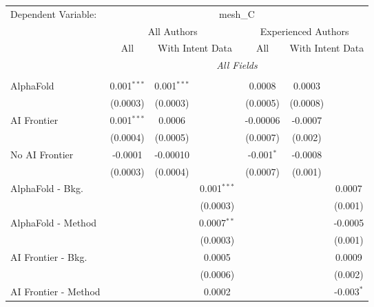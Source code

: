 \begingroup
\centering
\begin{tabular}{lcccccc}
   \tabularnewline \midrule \midrule
   Dependent Variable: & \multicolumn{6}{c}{mesh\_C}\\
 & \multicolumn{3}{c}{All Authors} & \multicolumn{3}{c}{Experienced Authors} \\
\cmidrule(lr){2-4} \cmidrule(lr){5-7}
 & \multicolumn{1}{c}{All} & \multicolumn{2}{c}{With Intent Data} & \multicolumn{1}{c}{All} & \multicolumn{2}{c}{With Intent Data} \\
\cmidrule(lr){2-2} \cmidrule(lr){3-4} \cmidrule(lr){5-5} \cmidrule(lr){6-7}
 & \multicolumn{6}{c}{\textit{All Fields}} \\ \\
   AlphaFold               & 0.001$^{***}$ & 0.001$^{***}$ &               & 0.0008       & 0.0003   &   \\   
                           & (0.0003)      & (0.0003)      &               & (0.0005)     & (0.0008) &   \\   
   AI Frontier             & 0.001$^{***}$ & 0.0006        &               & -0.00006     & -0.0007  &   \\   
                           & (0.0004)      & (0.0005)      &               & (0.0007)     & (0.002)  &   \\   
   No AI Frontier          & -0.0001       & -0.00010      &               & -0.001$^{*}$ & -0.0008  &   \\   
                           & (0.0003)      & (0.0004)      &               & (0.0007)     & (0.001)  &   \\   
   AlphaFold - Bkg.        &               &               & 0.001$^{***}$ &              &          & 0.0007\\   
                           &               &               & (0.0003)      &              &          & (0.001)\\   
   AlphaFold - Method      &               &               & 0.0007$^{**}$ &              &          & -0.0005\\   
                           &               &               & (0.0003)      &              &          & (0.001)\\   
   AI Frontier - Bkg.      &               &               & 0.0005        &              &          & 0.0009\\   
                           &               &               & (0.0006)      &              &          & (0.002)\\   
   AI Frontier - Method    &               &               & 0.0002        &              &          & -0.003$^{*}$\\   

\end{tabular}
